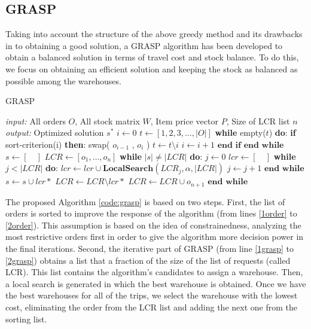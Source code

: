 \documentclass[letterpaper]{article} %
\begin{document}
\subsection*{GRASP}

Taking into account the structure of the above greedy method and its drawbacks in to obtaining a good solution, a GRASP algorithm has been developed to obtain a balanced solution in terms of travel cost and stock balance. To do this, we focus on obtaining an efficient solution and keeping the stock as balanced as possible among the warehouses.

\begin{algorithm}[H]
    \caption{GRASP}
    \label{alg:GRASP}
    \begin{algorithmic}[1] \label{code:grasp}
        \STATE \textit{input: } All orders $O$, All stock matrix $W$, Item price vector $P$, Size of LCR list $n$
        \STATE \textit{output: } Optimized solution $s^*$
        \STATE $i \longleftarrow 0 $
        \STATE $ t \longleftarrow [1,2,3,\dots,|O|]$
        \STATE \textbf{while} empty($t$) \textbf{do}: \label{1order}
        \STATE \quad \textbf{if} sort-criterion(i) \textbf{then}: \label{sort-criterion}
        \STATE \quad \quad swap( $ o_{i-1}$ , $ o_{i} $ )
        \STATE \quad \quad $t \longleftarrow t \setminus i$
        \STATE \quad \quad $i \longleftarrow i + 1$
        \STATE \quad $\textbf{end if}$
        \STATE $\textbf{end while}$ \label{2order}
        \STATE
        \STATE $s \longleftarrow [\quad] $
        \STATE $LCR \longleftarrow [o_1,\dots,o_n]$
        \STATE \textbf{while } $|s| \neq |LCR|$ \textbf{do}:\label{1grasp}
        \STATE \quad $j \longleftarrow 0 $
        \STATE \quad $lcr \longleftarrow [\quad]$
        \STATE \quad \textbf{while } $j < |LCR|$ \textbf{do}:
        \STATE \quad \quad $lcr \longleftarrow lcr \cup \textbf{LocalSearch}(LCR_j,\alpha,|LCR|)$
        \STATE \quad \quad $j \longleftarrow j + 1$
        \STATE \quad $\textbf{end while}$
        \STATE \quad $s \longleftarrow s \cup lcr*$ 
        \STATE \quad $LCR \longleftarrow LCR \setminus lcr*$ 
        \STATE \quad $LCR \longleftarrow LCR \cup  o_{n+1} $ 
        \STATE $\textbf{end while}$\label{2grasp}
    \end{algorithmic}
\end{algorithm}


The proposed Algorithm \ref{code:grasp} is based on two steps. First, the list of orders is sorted to improve the response of the algorithm (from lines \ref{1order} to \ref{2order}). This assumption is based on the idea of constrainedness, analyzing the most restrictive orders first in order to give the algorithm more decision power in the final iterations. Second, the iterative part of GRASP (from line \ref{1grasp} to \ref{2grasp}) obtains a list that a fraction of the size of the list of requests (called LCR). This list contains the algorithm's candidates to assign a warehouse. Then, a local search is generated in which the best warehouse is obtained. Once we have the best warehouses for all of the trips, we select the warehouse with the lowest cost, eliminating the order from the LCR list and adding the next one from the sorting list.
\end{document}
